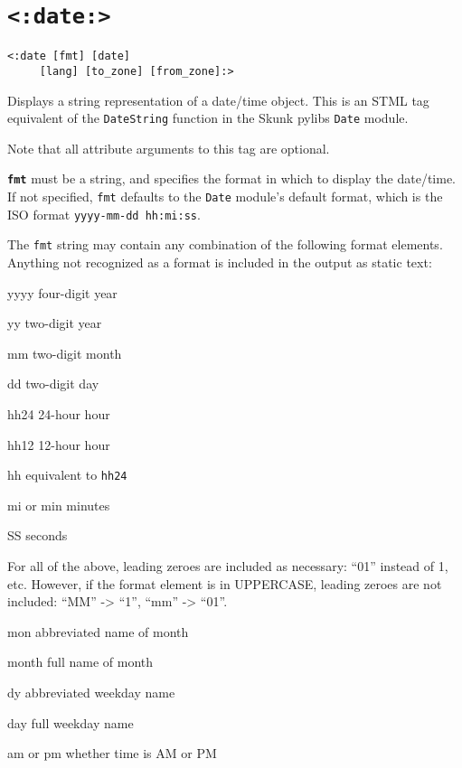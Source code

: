 \documentclass{manual}
\begin{document}
\section{\texttt{<:date:>}}
\label{tagdate}

\begin{verbatim}
<:date [fmt] [date] 
     [lang] [to_zone] [from_zone]:>
\end{verbatim}


Displays a string representation of a date/time object. This is 
an STML tag equivalent of the \texttt{DateString} function
in the Skunk pylibs \texttt{Date} module.

Note that all attribute arguments to this tag are optional.

\texttt{\textbf{fmt}} must be a string, and specifies the format in 
which to display the date/time. If not specified, \texttt{fmt} defaults to
the \texttt{Date} module's default format, which is the ISO format
\texttt{yyyy-mm-dd hh:mi:ss}.

    The \texttt{fmt} string may contain any combination of the 
    following format elements. Anything not recognized 
    as a format is included in the output as static text:

\begin{argdesc}
\item[yyyy] four-digit year
\item[yy] two-digit year
\item[mm] two-digit month
\item[dd] two-digit day
\item[hh24] 24-hour hour
\item[hh12] 12-hour hour
\item[hh] equivalent to \texttt{hh24}
\item[mi] or min minutes
\item[SS] seconds
\end{argdesc}

    For all of the above, leading zeroes are included 
    as necessary: ``01'' instead of 1, etc. However, 
    if the format element is in UPPERCASE, leading zeroes 
    are not included: ``MM'' -> ``1'', ``mm'' -> ``01''.

\begin{argdesc}
\item[mon] abbreviated name of month
\item[month] full name of month
\item[dy] abbreviated weekday name
\item[day] full weekday name
\item[am or pm] whether time is AM or PM
\end{argdesc}
\end{document}
